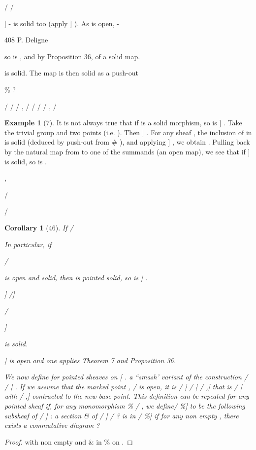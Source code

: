 \documentclass[11pt,a4paper]{article}
\theoremstyle{plain}
\newtheorem{corollary}[theorem]{Corollary}
\theoremstyle{definition}
\newtheorem{example}[theorem]{Example}
\begin{document}
/
/



]
-  is solid too (apply
]
). As
is open,
-





408
P. Deligne


so is , and by Proposition 36,
of a solid map.

 is solid. The map  is then solid as a push-out


 \%
?
 
/
/ / ,
/ / / / ,
/

\begin{example}[7]
It is not always true that if
is a solid morphism, so is
]
. Take the trivial group and
two points (i.e.
). Then ]
. For
any sheaf , the inclusion of in
is solid (deduced by push-out from
\#
), and applying  ] , we obtain
. Pulling back
by the natural map from to one of the summands (an open map), we see that if
]
is solid, so is .



,

/



/
\end{example}

\begin{corollary}[46]
If  /

In particular, if


 
/

is open and solid, then
is pointed solid, so is ] .

 ] /]

/

]

is solid.

 ] is open and one applies Theorem 7 and Proposition 36.

We now define for pointed sheaves on [ .   a ``smash' variant of the construction / 
/ ] . If we assume that the marked point , / is open, it is
/ ] / ] / ,]
that is / ] with / ,]
 contracted to the new base point. This definition can be
repeated for any pointed sheaf if, for any monomorphism \%
/ , we define/ \%]
to be the following subsheaf of / ] : a section \& of / ] 
/  ?  is in
/ \%] if for any non empty    , there exists a commutative diagram
     ?
\end{corollary}

\begin{proof}




  
with   non empty and \& in \% on   .










\end{proof}
\end{document}
